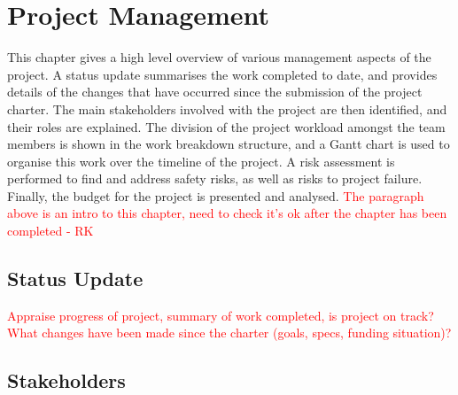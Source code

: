 \documentclass[main.tex]{subfiles}
\begin{document}
\chapter{Project Management}
This chapter gives a high level overview of various management aspects of the project. A status update summarises the work completed to date, and provides details of the changes that have occurred since the submission of the project charter. The main stakeholders involved with the project are then identified, and their roles are explained. The division of the project workload amongst the team members is shown in the work breakdown structure, and a Gantt chart is used to organise this work over the timeline of the project. A risk assessment is performed to find and address safety risks, as well as risks to project failure. Finally, the budget for the project is presented and analysed.  
\textcolor{red}{The paragraph above is an intro to this chapter, need to check it's ok after the chapter has been completed - RK}
\section{Status Update}
\textcolor{red}{Appraise progress of project, summary of work completed, is project on track? What changes have been made since the charter (goals, specs, funding situation)?}
\section{Stakeholders}



\end{document}
